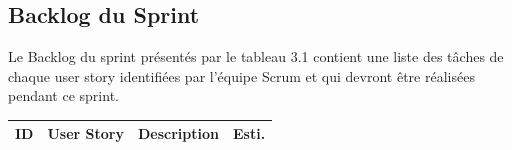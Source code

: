 \subsection{Backlog du Sprint} 
Le Backlog du sprint présentés par le tableau 3.1 contient une liste des tâches de chaque user story identifiées par l'équipe Scrum et qui
devront être réalisées pendant ce sprint.
\begin{table}[H]
	\begin{tabular}{|l|l|l|l|}
		\hline
		\textbf{ID}          & \textbf{User Story}                                                                                                                                                     & \textbf{Description}                                                                                                                                                     & \textbf{Esti.} \\ \hline
	

\end{tabular}
\end{table}
